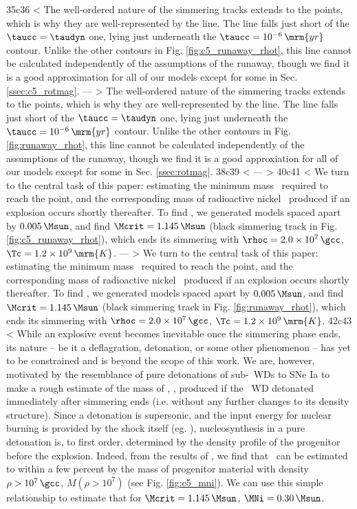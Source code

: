 35c36
< The well-ordered nature of the simmering tracks extends to the \citeal{wooswk04} points, which is why they are well-represented by the \citeal{wooswk04} line.  The line falls just short of the $\taucc = \taudyn$ one, lying just underneath the $\taucc = 10^{-6}\,\mrm{yr}$ contour.  Unlike the other contours in Fig. \ref{fig:c5_runaway_rhot}, this line cannot be calculated independently of the assumptions of the runaway, though we find it is a good approximation for all of our models except for some in Sec. \ref{ssec:c5_rotmag}.
---
> The well-ordered nature of the simmering tracks extends to the \citeal{wooswk04} points, which is why they are well-represented by the \citeal{wooswk04} line.  The line falls just short of the $\taucc = \taudyn$ one, lying just underneath the $\taucc = 10^{-6}\,\mrm{yr}$ contour.  Unlike the other contours in Fig. \ref{fig:runaway_rhot}, this line cannot be calculated independently of the assumptions of the runaway, though we find it is a good approxiation for all of our models except for some in Sec. \ref{ssec:rotmag}.
38c39
< \label{sssec:c5_mcritest_adiabatic}
---
> \label{sssec:mcritest_adiabatic}
40c41
< We turn to the central task of this paper: estimating the minimum mass \Mcrit\ required to reach the \citeal{wooswk04} point, and the corresponding mass of radioactive nickel \MNi\ produced if an explosion occurs shortly thereafter.  To find \Mcrit, we generated models spaced apart by $0.005\,\Msun$, and find $\Mcrit=1.145\,\Msun$ (black simmering track in Fig. \ref{fig:c5_runaway_rhot}), which ends its simmering with $\rhoc = 2.0\times10^7\,\gcc$, $\Tc = 1.2\times10^9\,\mrm{K}$.
---
> We turn to the central task of this paper: estimating the minimum mass \Mcrit\ required to reach the \citeal{wooswk04} point, and the corresponding mass of radioactive nickel \MNi\ produced if an explosion occurs shortly thereafter.  To find \Mcrit, we generated models spaced apart by $0.005\,\Msun$, and find $\Mcrit=1.145\,\Msun$ (black simmering track in Fig. \ref{fig:runaway_rhot}), which ends its simmering with $\rhoc = 2.0\times10^7\,\gcc$, $\Tc = 1.2\times10^9\,\mrm{K}$.
42c43
< While an explosive event becomes inevitable once the simmering phase ends, its nature -- be it a deflagration, detonation, or some other phenomenon -- has yet to be constrained and is beyond the scope of this work.  We are, however, motivated by the resemblance of pure detonations of sub-\Mch\ WDs to SNe Ia to make a rough estimate of the mass of \Ni, \MNi, produced if the \Mcrit\ WD detonated immediately after simmering ends (i.e. without any further changes to its density structure).  Since a detonation is supersonic, and the input energy for nuclear burning is provided by the shock itself (eg. \citealt{seit+09}), nucleosynthesis in a pure detonation is, to first order, determined by the density profile of the progenitor before the explosion.  Indeed, from the results of \cite{sim+10}, we find that \MNi\ can be estimated to within a few percent by the mass of progenitor material with density $\rho>10^7\,\gcc$, $M(\rho>10^7)$ (see Fig. \ref{fig:c5_mni}).  We can use this simple relationship to estimate that for $\Mcrit = 1.145\,\Msun$, $\MNi = 0.30\,\Msun$.  
